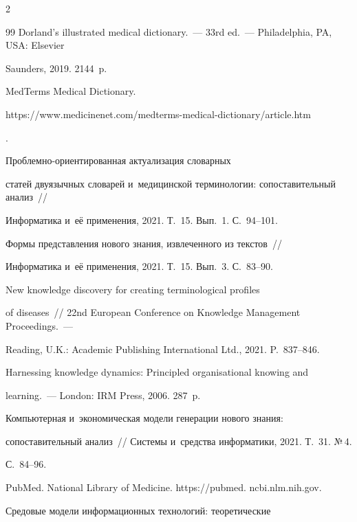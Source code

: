 \begin{multicols}{2}
{{\begin{thebibliography}{99}
Dorland's illustrated medical dictionary.~--- 33rd ed.~--- Philadelphia, PA, USA: Elsevier 

Saunders, 2019. 2144~p.


MedTerms Medical Dictionary. {\sf  

https://www.\linebreak medicinenet.com/medterms-medical-dictionary/article.\linebreak htm}.


 Проб\-лем\-но-ори\-ен\-ти\-ро\-ван\-ная актуализация словарных 

статей двуязычных словарей и~медицинской терминологии: сопоставительный анализ~// 

Информатика и~её применения, 2021. Т.~15. Вып.~1. С.~94--101.


 Формы представления нового знания, извлеченного из текс\-тов~// 

Информатика и~её применения, 2021. Т.~15. Вып.~3. С.~83--90.


 New knowledge discovery for creating terminological profiles 

of diseases~// 22nd European Conference on Knowledge Management Proceedings.~--- 

Reading, U.K.: Academic Publishing International Ltd., 2021. P.~837--846.


 Harnessing knowledge dynamics: Principled organisational knowing and 

learning.~--- London: IRM Press, 2006. 287~p.


 Компьютерная и~экономическая модели генерации нового знания: 

сопоставительный анализ~// Сис\-те\-мы и~средства информатики, 2021. Т.~31. №\,4.  

С.~84--96.


PubMed. National Library of Medicine. {\sf https://pubmed. ncbi.nlm.nih.gov}.


 Средовые модели информационных технологий: теоретические 


\end{thebibliography}}}
\end{multicols}
